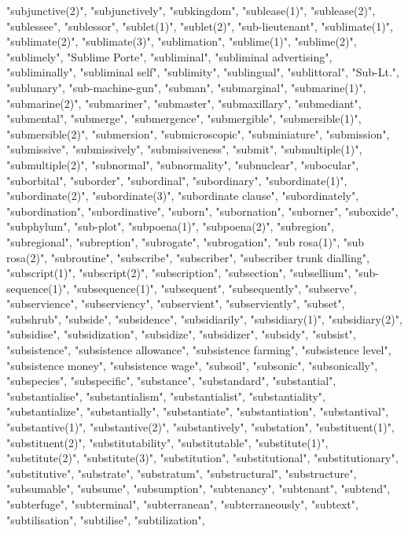"subjunctive(2)",
"subjunctively",
"subkingdom",
"sublease(1)",
"sublease(2)",
"sublessee",
"sublessor",
"sublet(1)",
"sublet(2)",
"sub-lieutenant",
"sublimate(1)",
"sublimate(2)",
"sublimate(3)",
"sublimation",
"sublime(1)",
"sublime(2)",
"sublimely",
"Sublime Porte",
"subliminal",
"subliminal advertising",
"subliminally",
"subliminal self",
"sublimity",
"sublingual",
"sublittoral",
"Sub-Lt.",
"sublunary",
"sub-machine-gun",
"subman",
"submarginal",
"submarine(1)",
"submarine(2)",
"submariner",
"submaster",
"submaxillary",
"submediant",
"submental",
"submerge",
"submergence",
"submergible",
"submersible(1)",
"submersible(2)",
"submersion",
"submicroscopic",
"subminiature",
"submission",
"submissive",
"submissively",
"submissiveness",
"submit",
"submultiple(1)",
"submultiple(2)",
"subnormal",
"subnormality",
"subnuclear",
"subocular",
"suborbital",
"suborder",
"subordinal",
"subordinary",
"subordinate(1)",
"subordinate(2)",
"subordinate(3)",
"subordinate clause",
"subordinately",
"subordination",
"subordinative",
"suborn",
"subornation",
"suborner",
"suboxide",
"subphylum",
"sub-plot",
"subpoena(1)",
"subpoena(2)",
"subregion",
"subregional",
"subreption",
"subrogate",
"subrogation",
"sub rosa(1)",
"sub rosa(2)",
"subroutine",
"subscribe",
"subscriber",
"subscriber trunk dialling",
"subscript(1)",
"subscript(2)",
"subscription",
"subsection",
"subsellium",
"sub-sequence(1)",
"subsequence(1)",
"subsequent",
"subsequently",
"subserve",
"subservience",
"subserviency",
"subservient",
"subserviently",
"subset",
"subshrub",
"subside",
"subsidence",
"subsidiarily",
"subsidiary(1)",
"subsidiary(2)",
"subsidise",
"subsidization",
"subsidize",
"subsidizer",
"subsidy",
"subsist",
"subsistence",
"subsistence allowance",
"subsistence farming",
"subsistence level",
"subsistence money",
"subsistence wage",
"subsoil",
"subsonic",
"subsonically",
"subspecies",
"subspecific",
"substance",
"substandard",
"substantial",
"substantialise",
"substantialism",
"substantialist",
"substantiality",
"substantialize",
"substantially",
"substantiate",
"substantiation",
"substantival",
"substantive(1)",
"substantive(2)",
"substantively",
"substation",
"substituent(1)",
"substituent(2)",
"substitutability",
"substitutable",
"substitute(1)",
"substitute(2)",
"substitute(3)",
"substitution",
"substitutional",
"substitutionary",
"substitutive",
"substrate",
"substratum",
"substructural",
"substructure",
"subsumable",
"subsume",
"subsumption",
"subtenancy",
"subtenant",
"subtend",
"subterfuge",
"subterminal",
"subterranean",
"subterraneously",
"subtext",
"subtilisation",
"subtilise",
"subtilization",
